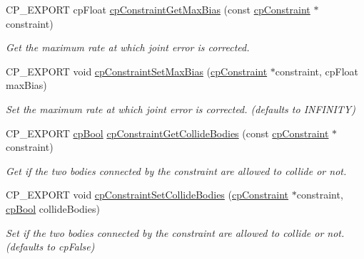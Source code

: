 \begin{DoxyCompactItemize}
\item 
\mbox{\label{group__cpConstraint_ga7218069af911d5886d6562f8b62e844d}} 
C\+P\+\_\+\+E\+X\+P\+O\+RT cp\+Float \hyperlink{group__cpConstraint_ga7218069af911d5886d6562f8b62e844d}{cp\+Constraint\+Get\+Max\+Bias} (const \hyperlink{structcpConstraint}{cp\+Constraint} $\ast$constraint)
\begin{DoxyCompactList}\small\item\em Get the maximum rate at which joint error is corrected. \end{DoxyCompactList}\item 
\mbox{\label{group__cpConstraint_ga22259bf6a01a04075e17c24c6167ced4}} 
C\+P\+\_\+\+E\+X\+P\+O\+RT void \hyperlink{group__cpConstraint_ga22259bf6a01a04075e17c24c6167ced4}{cp\+Constraint\+Set\+Max\+Bias} (\hyperlink{structcpConstraint}{cp\+Constraint} $\ast$constraint, cp\+Float max\+Bias)
\begin{DoxyCompactList}\small\item\em Set the maximum rate at which joint error is corrected. (defaults to I\+N\+F\+I\+N\+I\+TY) \end{DoxyCompactList}\item 
\mbox{\label{group__cpConstraint_gab01d5a088b2f2882d8b00fbd11cb5dd5}} 
C\+P\+\_\+\+E\+X\+P\+O\+RT \hyperlink{group__basicTypes_gabc5e752c48f3449ca26ef413ecbd647e}{cp\+Bool} \hyperlink{group__cpConstraint_gab01d5a088b2f2882d8b00fbd11cb5dd5}{cp\+Constraint\+Get\+Collide\+Bodies} (const \hyperlink{structcpConstraint}{cp\+Constraint} $\ast$constraint)
\begin{DoxyCompactList}\small\item\em Get if the two bodies connected by the constraint are allowed to collide or not. \end{DoxyCompactList}\item 
\mbox{\label{group__cpConstraint_ga4083314e3017e089d43ea6baa8c93adf}} 
C\+P\+\_\+\+E\+X\+P\+O\+RT void \hyperlink{group__cpConstraint_ga4083314e3017e089d43ea6baa8c93adf}{cp\+Constraint\+Set\+Collide\+Bodies} (\hyperlink{structcpConstraint}{cp\+Constraint} $\ast$constraint, \hyperlink{group__basicTypes_gabc5e752c48f3449ca26ef413ecbd647e}{cp\+Bool} collide\+Bodies)
\begin{DoxyCompactList}\small\item\em Set if the two bodies connected by the constraint are allowed to collide or not. (defaults to cp\+False) \end{DoxyCompactList}\item 

\end{DoxyCompactItemize}
